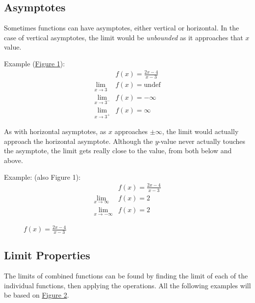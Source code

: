 \documentclass[12pt]{article}
\begin{document}
\subsection{Asymptotes}
Sometimes functions can have asymptotes, either vertical or horizontal. In the case of vertical asymptotes, the limit would be \textit{unbounded} as it approaches that $x$ value.

\noindent Example (\hyperref[fig:limasymptote]{Figure 1}):
\begin{align*}
                     & f(x) = \frac{2x-4}{x-3} \\
    \lim_{x \to 3}   & f(x) = \text{undef}     \\
    \lim_{x \to 3^-} & f(x) = -\infty          \\
    \lim_{x \to 3^+} & f(x) = \infty
\end{align*}

As with horizontal asymptotes, as $x$ approaches $\pm \infty$, the limit would actually approach the horizontal asymptote. Although the $y$-value never actually touches the asymptote, the limit gets really close to the value, from both below and above.

\noindent Example: (also Figure 1):
\begin{align*}
                         & f(x) = \frac{2x-4}{x-3} \\
    \lim_{x \to \infty}  & f(x) = 2                \\
    \lim_{x \to -\infty} & f(x) = 2
\end{align*}

\begin{figure}[H]
    \begin{center}
        \caption{$f(x) = \frac{2x-4}{x-3}$}
        \label{fig:limasymptote}
    \end{center}
\end{figure}

\subsection{Limit Properties}
The limits of combined functions can be found by finding the limit of each of the individual functions, then applying the operations. All the following examples will be based on \hyperref[fig:limasymptote]{Figure 2}.
\end{document}
